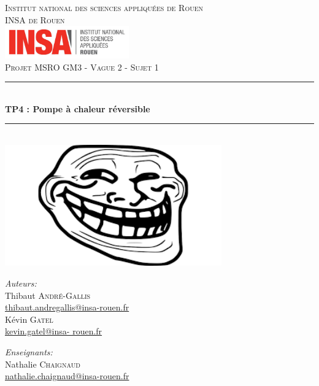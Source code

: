 \documentclass[12,french]{report}
\newcommand{\HRule}{\rule{\linewidth}{0.5mm}}
\begin{document}
\hypersetup{pdfborder=0 0 0}

\begin{titlepage}

\begin{center}
	\textsc{{\LARGE Institut national des sciences appliquées de Rouen} \\ 			\vspace{6mm} {\Large INSA de Rouen}} \\
	\vspace{5mm}
	\includegraphics[width=0.4\textwidth]{./Images/insa}\\[1.0 cm]

	\textsc{\Large Projet MSRO GM3 - Vague 2 - Sujet 1}\\[0.6cm]

	\HRule \\[0.5cm]
	{ \Huge \bfseries TP4 : Pompe à chaleur réversible}\\[0.2cm]
	\HRule \\[0.75cm]

	\includegraphics[width=0.7\textwidth]{./Images/Page_de_garde}\\[0.9 cm]

	\begin{minipage}{0.4\textwidth}
		\begin{flushleft} \large
			\emph{Auteurs:}\\
			Thibaut \textsc{André-Gallis} \\
			{\small\href{mailto:thibaut.andregallis@insa-rouen.fr}{thibaut.andregallis@insa-rouen.fr}} \\
			Kévin \textsc{Gatel} \\
			{\small\href{mailto:kevin.gatel@insa-rouen.fr}{kevin.gatel@insa-				rouen.fr}}
		\end{flushleft}
	\end{minipage}
	\begin{minipage}{0.4\textwidth}
		\begin{flushright} \large
			\emph{Enseignants:} \\
			Nathalie \textsc{Chaignaud} \\
			{\small\href{mailto:nathalie.chaignaud@insa-rouen.fr}								{nathalie.chaignaud@insa-rouen.fr}}\\
		\end{flushright}
	\end{minipage}


\end{center}
\end{titlepage}
\end{document}
